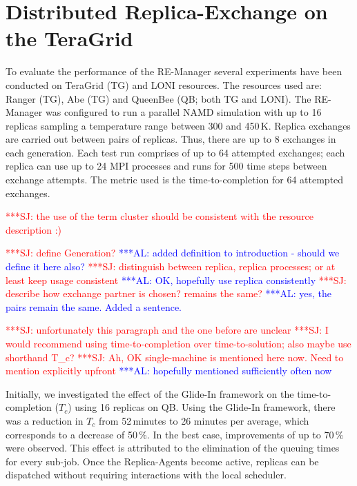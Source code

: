 \documentclass{rspublic}
\newcommand{\alnote}[1]{ {\textcolor{blue} { ***AL: #1 }}}
\newcommand{\jhanote}[1]{ {\textcolor{red} { ***SJ: #1 }}}
\newcommand{\alnote}[1]{}
\newcommand{\jhanote}[1]{}
\begin{document}
\section{Distributed Replica-Exchange on the TeraGrid}
\label{sec:exp}
        
To evaluate the performance of the RE-Manager several experiments have
been conducted on TeraGrid (TG) and LONI resources. The resources
used are: Ranger (TG), Abe (TG) and QueenBee (QB; both TG and LONI).
The RE-Manager was configured to run a parallel NAMD simulation with up to 16
replicas sampling a temperature range between 300 and 450\,K. Replica
exchanges are carried out between pairs of replicas. Thus,
there are up to 8 exchanges in each generation. Each test run comprises
of up to 64 attempted exchanges; each replica can 
use up to 24 MPI processes and runs for 500 time steps 
between exchange attempts. The metric used 
is the time-to-completion for 64 attempted exchanges.

\jhanote{the use of the term cluster should be consistent with the
  resource description :)}

\jhanote{define Generation?}  \alnote{added definition to introduction
  - should we define it here also?}  \jhanote{distinguish between
  replica, replica processes; or at least keep usage consistent}
\alnote{OK, hopefully use replica consistently} \jhanote{describe how
  exchange partner is chosen? remains the same?}\alnote{yes, the pairs
  remain the same. Added a sentence.}


\jhanote{unfortunately this paragraph and the one before are unclear}
\jhanote{I would recommend using time-to-completion over
  time-to-solution; also maybe use shorthand T\_c?}  \jhanote{Ah, OK
  single-machine is mentioned here now. Need to mention explicitly
  upfront} \alnote{hopefully mentioned sufficiently often now}

Initially, we investigated the effect of the 
Glide-In framework on the time-to-completion ($T_{c}$) using 16
replicas on QB.  Using the Glide-In framework, there was a reduction
in $T_{c}$ from 52\,minutes to 26 minutes per average, which
corresponds to a decrease of 50\,\%.  In the best case,
improvements of up to 70\,\% were observed. This effect
is attributed to the elimination of the queuing times for every
sub-job. Once the Replica-Agents become active, replicas can be
dispatched without requiring interactions with the local
scheduler.
\end{document}
